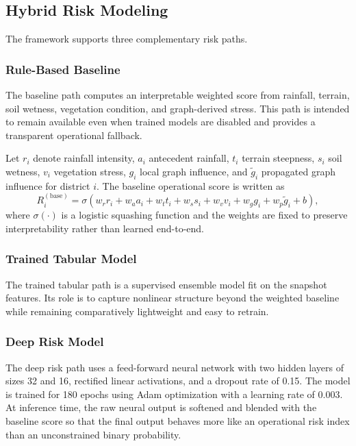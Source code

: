 \documentclass[pdflatex,sn-mathphys-num]{sn-jnl}
\begin{document}
\subsection{Hybrid Risk Modeling}

The framework supports three complementary risk paths.

\subsubsection{Rule-Based Baseline}

The baseline path computes an interpretable weighted score from rainfall, terrain, soil wetness, vegetation condition, and graph-derived stress. This path is intended to remain available even when trained models are disabled and provides a transparent operational fallback.

Let $r_i$ denote rainfall intensity, $a_i$ antecedent rainfall, $t_i$ terrain steepness, $s_i$ soil wetness, $v_i$ vegetation stress, $g_i$ local graph influence, and $\tilde{g}_i$ propagated graph influence for district $i$. The baseline operational score is written as
\begin{equation}
R_i^{(\mathrm{base})} = \sigma \left(
w_r r_i + w_a a_i + w_t t_i + w_s s_i + w_v v_i + w_g g_i + w_p \tilde{g}_i + b
\right),
\label{eq:baseline_risk}
\end{equation}
where $\sigma(\cdot)$ is a logistic squashing function and the weights are fixed to preserve interpretability rather than learned end-to-end.

\subsubsection{Trained Tabular Model}

The trained tabular path is a supervised ensemble model fit on the snapshot features. Its role is to capture nonlinear structure beyond the weighted baseline while remaining comparatively lightweight and easy to retrain.

\subsubsection{Deep Risk Model}

The deep risk path uses a feed-forward neural network with two hidden layers of sizes 32 and 16, rectified linear activations, and a dropout rate of 0.15. The model is trained for 180 epochs using Adam optimization with a learning rate of 0.003. At inference time, the raw neural output is softened and blended with the baseline score so that the final output behaves more like an operational risk index than an unconstrained binary probability.
\end{document}
